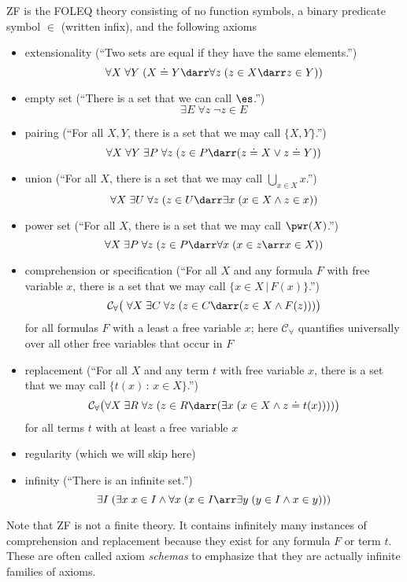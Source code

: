 \begin{definition}\label{def:zf}
ZF is the FOLEQ theory consisting of no function symbols, a binary predicate symbol $\in$ (written infix), and the following axioms
\begin{itemize}
\item extensionality (``Two sets are equal if they have the same elements.'')
 \[\forall X\;\forall Y\;(X\doteq Y \darr \forall z\;(z\in X \darr z \in Y))\]
\item empty set (``There is a set that we can call $\es$.'')
 \[\exists E\; \forall z\;\neg z\in E\]
\item pairing (``For all $X,Y$, there is a set that we may call $\{X,Y\}$.'')
 \[\forall X\;\forall Y\;\exists P\; \forall z\;(z\in P \darr (z\doteq X \vee z \doteq Y))\]
\item union (``For all $X$, there is a set that we may call $\bigcup_{x\in X}x$.'')
 \[\forall X \;\exists U\;\forall z\; (z\in U \darr \exists x\;(x \in X \wedge z\in x))\]
\item power set (``For all $X$, there is a set that we may call $\pwr(X)$.'')
 \[\forall X \;\exists P\;\forall z\; (z\in P \darr \forall x\;(x \in z\arr x\in X))\]
\item comprehension or specification (``For all $X$ and any formula $F$ with free variable $x$, there is a set that we may call $\{x\in X\,|\,F(x)\}$.'')
 \[\mathcal{C}_\forall\big(\;\forall X \;\exists C\;\forall z\; (z\in C \darr (z\in X\wedge F(z)))\big)\]
 for all formulas $F$ with a least a free variable $x$; here $\mathcal{C}_\forall$ quantifies universally over all other free variables that occur in $F$
\item replacement (``For all $X$ and any term $t$ with free variable $x$, there is a set that we may call $\{t(x)\,:\,x\in X\}$.'')
 \[\mathcal{C}_\forall\big(\forall X \;\exists R\;\forall z\; (z\in R \darr (\exists x\;(x\in X\wedge z\doteq t(x))))\big)\]
 for all terms $t$ with at least a free variable $x$
\item regularity (which we will skip here)
\item infinity (``There is an infinite set.'')
 \[\exists I\;(\exists x\;x\in I \wedge \forall x\;(x\in I\arr \exists y\;(y\in I\wedge x\in y)))\]
\end{itemize}
\end{definition}

Note that ZF is not a finite theory. It contains infinitely many instances of comprehension and replacement because they exist for any formula $F$ or term $t$. These are often called axiom \emph{schemas} to emphasize that they are actually infinite families of axioms.

